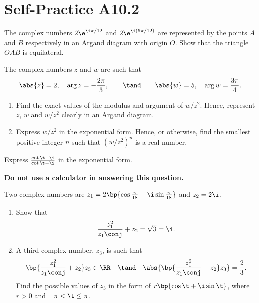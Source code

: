 \section{Self-Practice A10.2}

\begin{problem}
    The complex numbers $2\e^{\i \pi /12}$ and $2\e^{\i (5\pi/12)}$ are represented by the points $A$ and $B$ respectively in an Argand diagram with origin $O$. Show that the triangle $OAB$ is equilateral.
\end{problem}

\begin{problem}
    The complex numbers $z$ and $w$ are such that \[\abs{z} = 2, \quad \arg{z} = -\frac{2\pi}3, \qquad \tand \qquad \abs{w} = 5, \quad \arg{w} = \frac{3\pi}4.\]

    \begin{enumerate}
        \item Find the exact values of the modulus and argument of $w/z^2$. Hence, represent $z$, $w$ and $w/z^2$ clearly in an Argand diagram.
        \item Express $w/z^2$ in the exponential form. Hence, or otherwise, find the smallest positive integer $n$ such that $(w/z^2)^n$ is a real number.
    \end{enumerate}
\end{problem}

\begin{problem}
    Express $\frac{\cot \t + \i}{\cot \t - \i}$ in the exponential form.
\end{problem}

\begin{problem}
    \textbf{Do not use a calculator in answering this question.}

    Two complex numbers are $z_1 = 2\bp{\cos \frac\pi{18} - \i \sin \frac\pi{18}}$ and $z_2 = 2\i$.

    \begin{enumerate}
        \item Show that \[\frac{z_1^2}{z_1\conj} + z_2 = \sqrt3 = \i.\]
        \item A third complex number, $z_3$, is such that \[\bp{\frac{z_1^2}{z_1\conj} + z_2} z_3 \in \RR \quad \tand \quad \abs{\bp{\frac{z_1^2}{z_1\conj} + z_2} z_3} = \frac23.\] Find the possible values of $z_3$ in the form of $r\bp{\cos \t + \i \sin \t}$, where $r > 0$ and $-\pi < \t \leq \pi$.
    \end{enumerate}
\end{problem}

